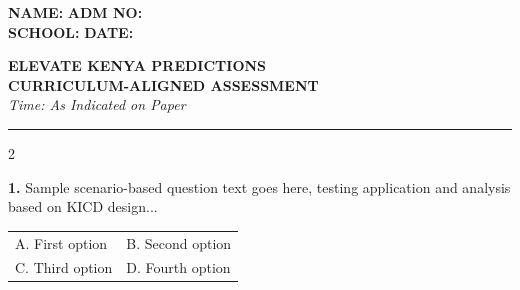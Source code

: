 \documentclass[twocolumn, 12pt]{article}
\begin{document}
\noindent
\textbf{NAME:} \underline{\hspace{5cm}} \hfill \textbf{ADM NO:} \underline{\hspace{3cm}} \\
\textbf{SCHOOL:} \underline{\hspace{5cm}} \hfill \textbf{DATE:} \underline{\hspace{3cm}} \\
\begin{center}
    \textbf{ELEVATE KENYA PREDICTIONS}\\
    \textbf{CURRICULUM-ALIGNED ASSESSMENT}\\
    \textit{Time: As Indicated on Paper}
\end{center}
\hrule
\vspace{1em}

\begin{multicols}{2}

\noindent \textbf{1.} Sample scenario-based question text goes here, testing application and analysis based on KICD design...

\vspace{0.5em}
\noindent
\begin{tabular}{p{} p{}}
    A. First option & B. Second option \\
    C. Third option & D. Fourth option
\end{tabular}

\end{multicols}
\end{document}
